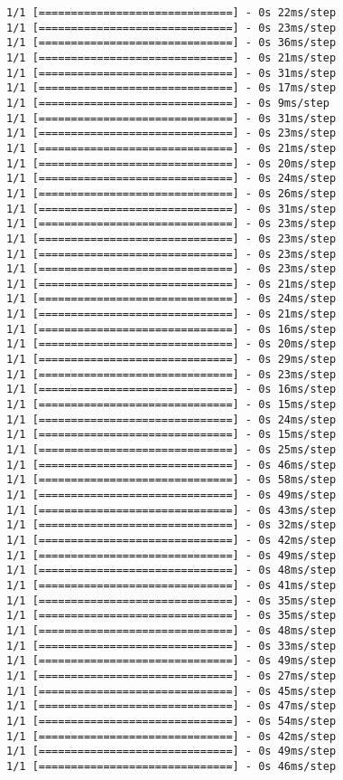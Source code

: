 \documentclass[11pt]{article}
\begin{document}
\begin{Verbatim}[commandchars=\\\{\}]
1/1 [==============================] - 0s 22ms/step
1/1 [==============================] - 0s 23ms/step
1/1 [==============================] - 0s 36ms/step
1/1 [==============================] - 0s 21ms/step
1/1 [==============================] - 0s 31ms/step
1/1 [==============================] - 0s 17ms/step
1/1 [==============================] - 0s 9ms/step
1/1 [==============================] - 0s 31ms/step
1/1 [==============================] - 0s 23ms/step
1/1 [==============================] - 0s 21ms/step
1/1 [==============================] - 0s 20ms/step
1/1 [==============================] - 0s 24ms/step
1/1 [==============================] - 0s 26ms/step
1/1 [==============================] - 0s 31ms/step
1/1 [==============================] - 0s 23ms/step
1/1 [==============================] - 0s 23ms/step
1/1 [==============================] - 0s 23ms/step
1/1 [==============================] - 0s 23ms/step
1/1 [==============================] - 0s 21ms/step
1/1 [==============================] - 0s 24ms/step
1/1 [==============================] - 0s 21ms/step
1/1 [==============================] - 0s 16ms/step
1/1 [==============================] - 0s 20ms/step
1/1 [==============================] - 0s 29ms/step
1/1 [==============================] - 0s 23ms/step
1/1 [==============================] - 0s 16ms/step
1/1 [==============================] - 0s 15ms/step
1/1 [==============================] - 0s 24ms/step
1/1 [==============================] - 0s 15ms/step
1/1 [==============================] - 0s 25ms/step
1/1 [==============================] - 0s 46ms/step
1/1 [==============================] - 0s 58ms/step
1/1 [==============================] - 0s 49ms/step
1/1 [==============================] - 0s 43ms/step
1/1 [==============================] - 0s 32ms/step
1/1 [==============================] - 0s 42ms/step
1/1 [==============================] - 0s 49ms/step
1/1 [==============================] - 0s 48ms/step
1/1 [==============================] - 0s 41ms/step
1/1 [==============================] - 0s 35ms/step
1/1 [==============================] - 0s 35ms/step
1/1 [==============================] - 0s 48ms/step
1/1 [==============================] - 0s 33ms/step
1/1 [==============================] - 0s 49ms/step
1/1 [==============================] - 0s 27ms/step
1/1 [==============================] - 0s 45ms/step
1/1 [==============================] - 0s 47ms/step
1/1 [==============================] - 0s 54ms/step
1/1 [==============================] - 0s 42ms/step
1/1 [==============================] - 0s 49ms/step
1/1 [==============================] - 0s 46ms/step

\end{Verbatim}
\end{document}
